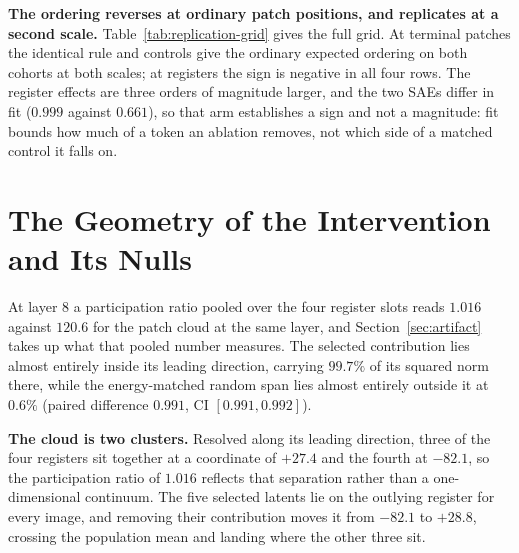 \documentclass{article}
\begin{document}
\textbf{The ordering reverses at ordinary patch positions, and replicates at a second scale.} Table~\ref{tab:replication-grid} gives the full grid. At terminal patches the identical rule and controls give the ordinary expected ordering on both cohorts at both scales; at registers the sign is negative in all four rows. The register effects are three orders of magnitude larger, and the two SAEs differ in fit ($0.999$ against $0.661$), so that arm establishes a sign and not a magnitude: fit bounds how much of a token an ablation removes, not which side of a matched control it falls on.

\section{The Geometry of the Intervention and Its Nulls}
\label{sec:geometry}

At layer 8 a participation ratio pooled over the four register slots reads $1.016$ against $120.6$ for the patch cloud at the same layer, and Section~\ref{sec:artifact} takes up what that pooled number measures. The selected contribution lies almost entirely inside its leading direction, carrying $99.7\%$ of its squared norm there, while the energy-matched random span lies almost entirely outside it at $0.6\%$ (paired difference $0.991$, CI $[0.991,0.992]$).

\textbf{The cloud is two clusters.} Resolved along its leading direction, three of the four registers sit together at a coordinate of $+27.4$ and the fourth at $-82.1$, so the participation ratio of $1.016$ reflects that separation rather than a one-dimensional continuum. The five selected latents lie on the outlying register for every image, and removing their contribution moves it from $-82.1$ to $+28.8$, crossing the population mean and landing where the other three sit.
\end{document}
